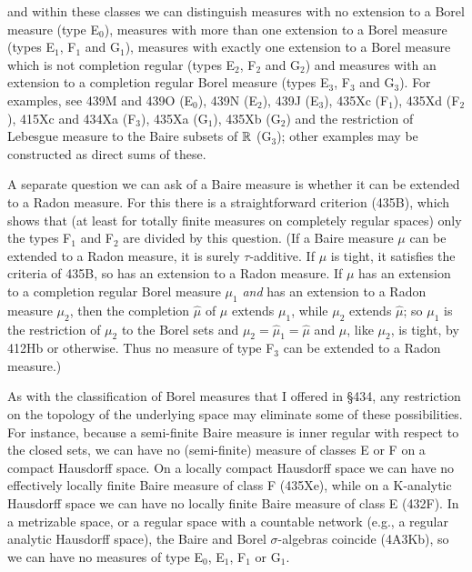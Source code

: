 {


\noindent and within these classes we can distinguish measures with no
extension to a Borel measure (type E$_0$), measures with more than one
extension to a Borel measure (types E$_1$, F$_1$ and G$_1$), measures
with exactly one extension to a Borel measure which is not completion
regular (types E$_2$, F$_2$ and G$_2$) and measures with an extension to
a completion regular Borel measure (types E$_3$, F$_3$ and G$_3$).   For
examples, see 439M and 439O (E$_0$), 439N (E$_2$), 439J
(E$_3$), 435Xc (F$_1$), 435Xd (F$_2$), 415Xc and 434Xa (F$_3$), 435Xa
(G$_1$), 435Xb (G$_2$) and the
restriction of Lebesgue measure to the Baire subsets of $\Bbb R$
(G$_3$);   other
examples may be constructed as direct sums of these.

A separate question we can ask of a Baire measure is whether it can be
extended to a Radon measure.   For this there is a straightforward
criterion (435B), which shows that (at least for totally finite measures
on completely regular spaces) only the types F$_1$ and F$_2$ are divided
by this question.   (If a Baire measure $\mu$ can be extended to a Radon
measure, it is surely
$\tau$-additive.   If $\mu$ is tight, it satisfies the criteria of 435B,
so has an extension to a Radon
measure.   If $\mu$ has an extension to a completion regular Borel
measure $\mu_1$ {\it and} has an extension to a Radon measure $\mu_2$,
then the completion $\hat\mu$ of $\mu$ extends $\mu_1$, while $\mu_2$
extends $\hat\mu$;   so $\mu_1$ is the restriction of $\mu_2$ to the
Borel sets and $\mu_2=\hat\mu_1=\hat\mu$ and $\mu$, like $\mu_2$, is
tight, by 412Hb or otherwise.
Thus no measure of type F$_3$ can be extended to a Radon measure.)

As with the classification of Borel measures that I offered in \S434,
any restriction on the topology of the underlying space may eliminate
some of these possibilities.   For instance, because a semi-finite Baire
measure is inner regular with respect to the closed sets, we can have no
(semi-finite) measure of classes E or F on a compact Hausdorff space.
On a locally compact Hausdorff space we can have no effectively locally
finite Baire measure of class F (435Xe), while on a
K-analytic Hausdorff space we can have no locally finite Baire
measure of class E (432F).   In a metrizable space, or a regular
space with a countable network (e.g., a regular analytic Hausdorff space),
the Baire and Borel $\sigma$-algebras coincide
(4A3Kb), so we can have no measures of type E$_0$, E$_1$,
F$_1$ or G$_1$.
}%

